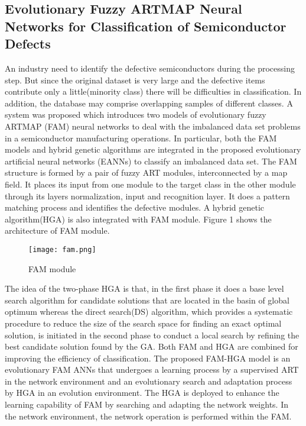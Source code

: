 \documentclass[10pt,a4paper,journal]{IEEEtran}
\begin{document}
\subsection{Evolutionary Fuzzy ARTMAP Neural Networks for Classification of Semiconductor Defects}
\hspace{2em}An industry need to identify the defective semiconductors during the processing step. But since the original dataset is very large and the defective items contribute only a little(minority class) there will be difficulties in classification. In addition, the database may comprise overlapping samples of different classes. A system was proposed\cite{4} which introduces two models of evolutionary fuzzy ARTMAP (FAM)\cite{5} neural networks to deal with the imbalanced data set problems in a semiconductor manufacturing operations. In particular, both the FAM models and hybrid genetic algorithms are integrated in the proposed evolutionary artificial neural networks (EANNs) to classify an imbalanced data set. The FAM structure is formed by a pair of fuzzy ART modules, interconnected by a map field. It places its input from one module  to the target class in the other module through its layers normalization, input and recognition layer. It does a pattern matching process and identifies the defective modules. A hybrid genetic algorithm(HGA) is also integrated with FAM module. Figure 1 shows the architecture of FAM module.
\begin{figure}
\hbox{\texttt{[image: fam.png]}}
\caption{FAM module}
\end{figure}
The idea of the two-phase HGA\cite{6} is that, in the first phase it does a base level search algorithm for candidate solutions that are located in the basin of global optimum whereas the direct search(DS) algorithm, which provides a systematic procedure to reduce the size of the search space for finding an exact optimal solution, is initiated in the second phase to conduct a local search by refining the best candidate solution found by the GA. Both FAM and HGA are combined for improving the efficiency of classification. The proposed FAM-HGA model is an evolutionary FAM ANNs that undergoes a learning process by a supervised ART in the network environment and an evolutionary search and adaptation process by HGA in an evolution environment. The HGA is deployed to enhance the learning capability of FAM by searching and adapting the network weights. In the network environment, the network operation is performed within the FAM.\\
\end{document}
